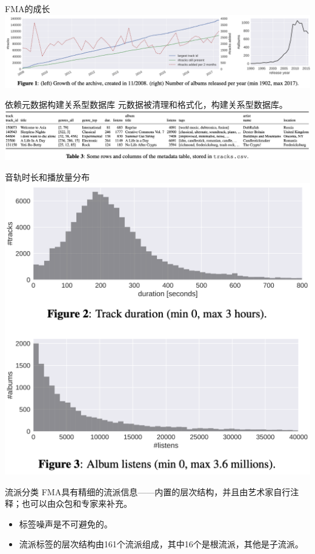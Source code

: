 \documentclass{beamer}
\begin{document}
\begin{frame}{FMA的成长}
	\includegraphics[width=\linewidth]{Assets/图1}
\end{frame}

\begin{frame}{依赖元数据构建关系型数据库}
	元数据被清理和格式化，构建关系型数据库。
	\includegraphics[width=\linewidth]{Assets/表3}
\end{frame}

\begin{frame}{音轨时长和播放量分布}
	\includegraphics[width=0.8\linewidth]{Assets/图2_3}
\end{frame}

\begin{frame}{流派分类}
	FMA具有精细的流派信息——内置的层次结构，并且由艺术家自行注释；也可以由众包和专家来补充。
	\begin{itemize}
		\item 标签噪声是不可避免的。
		\item 流派标签的层次结构由161个流派组成，其中16个是根流派，其他是子流派。
	\end{itemize}
\end{frame}
\end{document}
